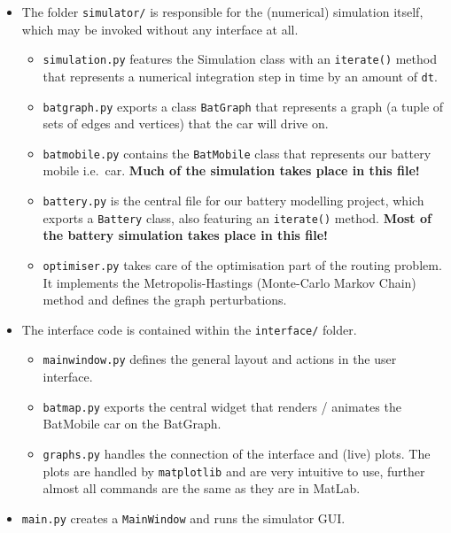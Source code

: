 \documentclass{prettytex/ox/mmsc-special-topic}
\begin{document}
  \begin{itemize}
    \tightlist
    \item
          The folder \texttt{simulator/} is responsible for the (numerical)
          simulation itself, which may be invoked without any interface at all.

          \begin{itemize}
            \tightlist
            \item
                  \texttt{simulation.py} features the Simulation class with an
                  \texttt{iterate()} method that represents a numerical integration
                  step in time by an amount of \texttt{dt}.
            \item
                  \texttt{batgraph.py} exports a class \texttt{BatGraph} that
                  represents a graph (a tuple of sets of edges and vertices) that the
                  car will drive on.
            \item
                  \texttt{batmobile.py} contains the \texttt{BatMobile} class that
                  represents our battery mobile i.e.~car. \textbf{Much of the
                    simulation takes place in this file!}
            \item
                  \texttt{battery.py} is the central file for our battery modelling
                  project, which exports a \texttt{Battery} class, also featuring an
                  \texttt{iterate()} method. \textbf{Most of the battery simulation
                    takes place in this file!}
            \item
                  \texttt{optimiser.py} takes care of the optimisation part of the routing problem. It implements the Metropolis-Hastings (Monte-Carlo Markov Chain) method and defines the graph perturbations.
          \end{itemize}
    \item
          The interface code is contained within the \texttt{interface/} folder.

          \begin{itemize}
            \tightlist
            \item
                  \texttt{mainwindow.py} defines the general layout and actions in the
                  user interface.
            \item
                  \texttt{batmap.py} exports the central widget that renders /
                  animates the BatMobile car on the BatGraph.
            \item
                  \texttt{graphs.py} handles the connection of the interface and
                  (live) plots. The plots are handled by \texttt{matplotlib} and are
                  very intuitive to use, further almost all commands are the same as
                  they are in MatLab.
          \end{itemize}
    \item
          \texttt{main.py} creates a \texttt{MainWindow} and runs the simulator
          GUI.
  \end{itemize}
\end{document}
